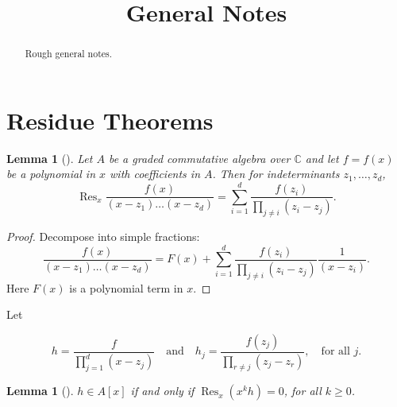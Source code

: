 \documentclass{article}
\title{General Notes}
\date{}	%
\newtheorem{lemma}[theorem]{Lemma}
\newcommand{\CC}{\mathbb{C}}
\DeclareMathOperator{\Res}{Res}
\begin{document}
	\maketitle
	
	\begin{abstract}
		Rough general notes.
	\end{abstract}
	
	\section{Residue Theorems}
	
	\begin{lemma}[\cite{Guillemin1999}]\label{residue:1}
		Let $A$ be a graded commutative algebra over $\CC$ and let $f = f(x)$ be a polynomial in $x$ with coefficients in $A$. Then for indeterminants $z_{1}, \ldots, z_{d}$,
		\begin{equation*}
			\Res_{x} \frac{f(x)}{(x - z_{1})\ldots(x - z_{d})} = \sum\limits_{i = 1}^{d}\frac{f(z_{i})}{\prod_{j \neq i}(z_{i} - z_{j})}.
		\end{equation*}
	\end{lemma}
	
	\begin{proof}
		Decompose into simple fractions:
		\begin{equation*}
			\frac{f(x)}{(x - z_{1})\ldots(x - z_{d})} = F(x) + \sum\limits_{i = 1}^{d} \frac{f(z_{i})}{\prod_{j \neq i} (z_{i} - z_{j})} \frac{1}{(x - z_{i})}.
		\end{equation*}
		Here $F(x)$ is a polynomial term in $x$.
	\end{proof}
	
	Let
	
	\begin{equation*}
		h = \frac{f}{ \prod_{j = 1}^{d}(x - z_{j}) } \quad \text{and} \quad h_{j} = \frac{f(z_{j})}{\prod_{r \neq j}(z_{j} - z_{r})}, \quad \text{for all } j.
	\end{equation*}
	
	\begin{lemma}[\cite{Guillemin1999}]\label{residue:2}
		$h \in A[x]$ if and only if $\Res_{x}(x^{k}h) = 0$, for all $k \geq 0$.
	\end{lemma}
	
\end{document}
